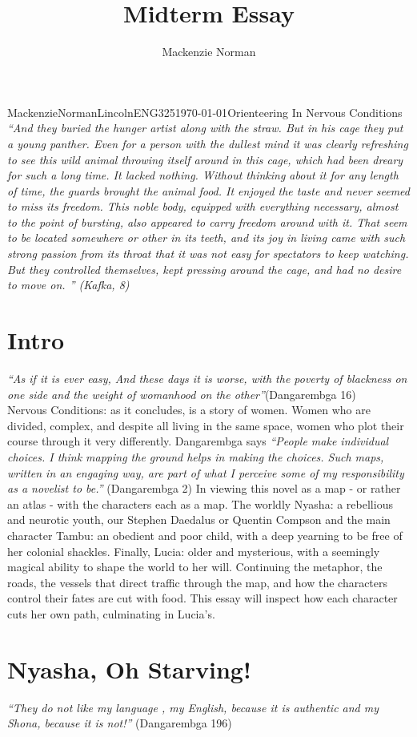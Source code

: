 \documentclass{article}
\title{Midterm Essay}
\author{Mackenzie Norman}
\begin{document}
\begin{mla}{Mackenzie}{Norman}{Lincoln}{ENG325}{\today}{Orienteering In Nervous Conditions}
\textit{``And they buried the hunger artist along with the straw. But in his cage they put a young panther. Even for a person with the dullest mind it was clearly refreshing to see this wild animal throwing itself around in this cage, which had been dreary for such a long time. It lacked nothing. Without thinking about it for any length of time, the guards brought the animal food. It enjoyed the taste and never seemed to miss its freedom. This noble body, equipped with everything necessary, almost to the point of bursting, also appeared to carry freedom around with it. That seem to be located somewhere or other in its teeth, and its joy in living came with such strong passion from its throat that it was not easy for spectators to keep watching. But they controlled themselves, kept pressing around the cage, and had no desire to move on. '' (Kafka, 8)}
\section*{Intro}

\textit{``As if it is ever easy, And these days it is worse, with the poverty of blackness on one side and the weight of womanhood on the other''}(Dangarembga 16)\\ Nervous Conditions: as it concludes, is a story of women. Women who are divided, complex, and despite all living in the same space, women who plot their course through it  very differently. Dangarembga says \textit{``People make individual choices. I think mapping the ground helps in making the choices. Such maps, written in an engaging way, are part of what I perceive some of my responsibility as a novelist to be.''} (Dangarembga 2) In viewing this novel as a map - or rather an atlas - with the characters each as a map. The worldly Nyasha: a rebellious and neurotic youth, our Stephen Daedalus or Quentin Compson and the main character Tambu: an obedient and poor child, with a deep yearning to be free of her colonial shackles.  Finally, Lucia: older and mysterious, with a seemingly magical ability to shape the world to her will. Continuing the metaphor, the roads, the vessels that direct traffic through the map, and how the characters control their fates are cut with food. This essay will inspect how each character cuts her own path, culminating in Lucia's. 


\section*{Nyasha, Oh Starving!}
\textit{``They do not like my language , my English, because it is authentic and my Shona, because it is not!'' }(Dangarembga 196)

\end{mla}
\end{document}
